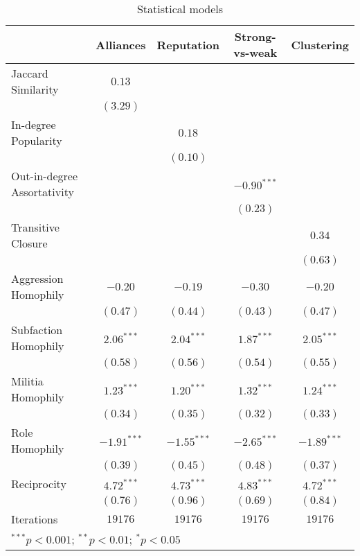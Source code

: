 
\begin{table}
\begin{center}
\begin{tabular}{l c c c c}
\hline
 & Alliances & Reputation & Strong-vs-weak & Clustering \\
\hline
Jaccard Similarity          & $0.13$        &               &               &               \\
                            & $(3.29)$      &               &               &               \\
In-degree Popularity        &               & $0.18$        &               &               \\
                            &               & $(0.10)$      &               &               \\
Out-in-degree Assortativity &               &               & $-0.90^{***}$ &               \\
                            &               &               & $(0.23)$      &               \\
Transitive Closure          &               &               &               & $0.34$        \\
                            &               &               &               & $(0.63)$      \\
Aggression Homophily        & $-0.20$       & $-0.19$       & $-0.30$       & $-0.20$       \\
                            & $(0.47)$      & $(0.44)$      & $(0.43)$      & $(0.47)$      \\
Subfaction Homophily        & $2.06^{***}$  & $2.04^{***}$  & $1.87^{***}$  & $2.05^{***}$  \\
                            & $(0.58)$      & $(0.56)$      & $(0.54)$      & $(0.55)$      \\
Militia Homophily           & $1.23^{***}$  & $1.20^{***}$  & $1.32^{***}$  & $1.24^{***}$  \\
                            & $(0.34)$      & $(0.35)$      & $(0.32)$      & $(0.33)$      \\
Role Homophily              & $-1.91^{***}$ & $-1.55^{***}$ & $-2.65^{***}$ & $-1.89^{***}$ \\
                            & $(0.39)$      & $(0.45)$      & $(0.48)$      & $(0.37)$      \\
Reciprocity                 & $4.72^{***}$  & $4.73^{***}$  & $4.83^{***}$  & $4.72^{***}$  \\
                            & $(0.76)$      & $(0.96)$      & $(0.69)$      & $(0.84)$      \\
\hline
Iterations                  & $19176$       & $19176$       & $19176$       & $19176$       \\
\hline
\multicolumn{5}{l}{\scriptsize{$^{***}p<0.001$; $^{**}p<0.01$; $^{*}p<0.05$}}
\end{tabular}
\caption{Statistical models}
\label{table:coefficients}
\end{center}
\end{table}
